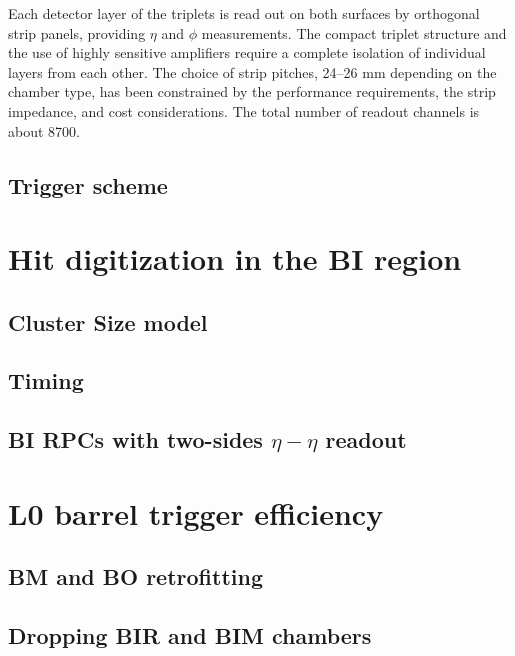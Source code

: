 Each detector layer of the triplets is read out on both surfaces by orthogonal strip panels,
providing $\eta$ and $\phi$ measurements. The compact triplet structure and the use of highly
sensitive amplifiers require a complete isolation of individual layers from each other. The
choice of strip pitches, 24–26 mm depending on the chamber type, has been constrained
by the performance requirements, the strip impedance, and cost considerations. The total
number of readout channels is about 8700.

\subsection {Trigger scheme}
\section{Hit digitization in the BI region}
\label{sec:trigScheme}
\clearpage
\subsection{Cluster Size model}

\clearpage
\subsection{Timing}

\clearpage
\subsection{BI RPCs with two-sides $\eta − \eta$ readout}
	
\clearpage
\section{L0 barrel trigger efficiency}

\clearpage
\subsection{BM and BO retrofitting}

\clearpage
\subsection{Dropping BIR and BIM chambers}

\clearpage
